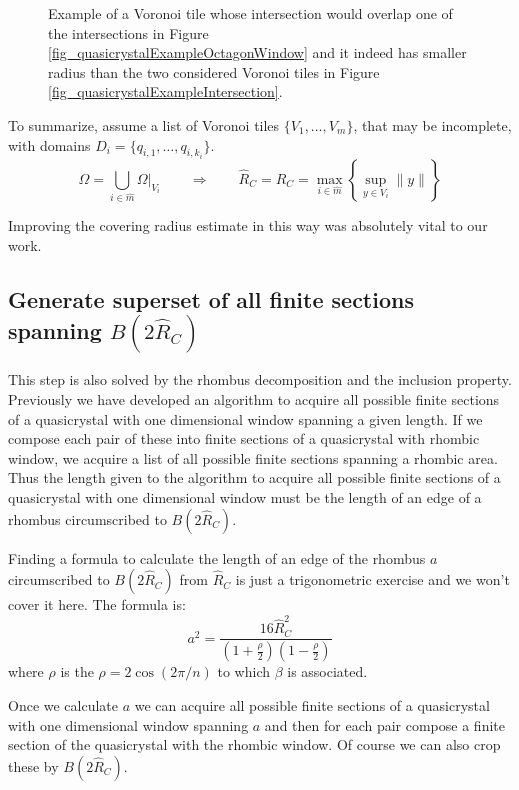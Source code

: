 \documentclass[text.tex]{subfiles}
\begin{document}
\begin{figure}[h!]
\begin{minipage}{0.4\textwidth}
\end{minipage}
\caption{Example of a Voronoi tile whose intersection would overlap one of the intersections in Figure \ref{fig_quasicrystalExampleOctagonWindow} and it indeed has smaller radius than the two considered Voronoi tiles in Figure \ref{fig_quasicrystalExampleIntersection}. }
\label{fig_quasicrystalExampleIntersection02}
\end{figure}

To summarize, assume a list of Voronoi tiles $\{V_1,\dots,V_m\}$, that may be incomplete, with domains $D_i = \{q_{i,1},\dots,q_{i,k_i}\}$. 
$$\Omega = \bigcup\limits_{i\in\hat{m}}\Omega|_{V_i} \qquad\Rightarrow\qquad \hat{R}_C = R_C = \max_{i\in\hat{m}}\left\{\sup_{y\in V_i}\lVert y\rVert\right\}$$

Improving the covering radius estimate in this way was absolutely vital to our work. 

\subsection{Generate superset of all finite sections spanning $B(2\hat{R}_C)$}\label{sec_2DsupersetFiniteSections}
This step is also solved by the rhombus decomposition and the inclusion property. Previously we have developed an algorithm to acquire all possible finite sections of a quasicrystal with one dimensional window spanning a given length. If we compose each pair of these into finite sections of a quasicrystal with rhombic window, we acquire a list of all possible finite sections spanning a rhombic area. Thus the length given to the algorithm to acquire all possible finite sections of a quasicrystal with one dimensional window must be the length of an edge of a rhombus circumscribed to $B(2\hat{R}_C)$. 

Finding a formula to calculate the length of an edge of the rhombus $a$ circumscribed to $B(2\hat{R}_C)$ from $\hat{R}_C$ is just a trigonometric exercise and we won't cover it here. The formula is: 
$$a^2 = \frac{16\hat{R}_C^2}{\left(1+\frac{\rho}{2}\right)\left(1-\frac{\rho}{2}\right)}$$
where $\rho$ is the $\rho=2\cos\left(2\pi/n\right)$ to which $\beta$ is associated. 

Once we calculate $a$ we can acquire all possible finite sections of a quasicrystal with one dimensional window spanning $a$ and then for each pair compose a finite section of the quasicrystal with the rhombic window. Of course we can also crop these by $B(2\hat{R}_C)$. 
\end{document}
